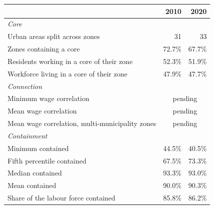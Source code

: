 \begin{tabular}{lrr}
\toprule
& 2010 & 2020 \\
\midrule
\multicolumn{3}{l}{\emph{Core}} \\
\quad Urban areas split across zones & 31 & 33 \\
\quad Zones containing a core & 72.7\% & 67.7\% \\
\quad Residents working in a core of their zone & 52.3\% & 51.9\% \\
\quad Workforce living in a core of their zone & 47.9\% & 47.7\% \\[3pt]
\multicolumn{3}{l}{\emph{Connection}} \\
\quad Minimum wage correlation & \multicolumn{2}{c}{pending} \\
\quad Mean wage correlation & \multicolumn{2}{c}{pending} \\
\quad Mean wage correlation, multi-municipality zones & \multicolumn{2}{c}{pending} \\[3pt]
\multicolumn{3}{l}{\emph{Containment}} \\
\quad Minimum contained & 44.5\% & 40.5\% \\
\quad Fifth percentile contained & 67.5\% & 73.3\% \\
\quad Median contained & 93.3\% & 93.0\% \\
\quad Mean contained & 90.0\% & 90.3\% \\
\quad Share of the labour force contained & 85.8\% & 86.2\% \\
\bottomrule
\end{tabular}
